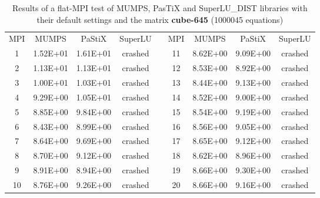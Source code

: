 \begin{table}[ht]
\centering
\begin{tabular}{|c|c|c|c|l|c|c|c|c|}
\cline{1-4} \cline{6-9}
MPI & MUMPS    & PaStiX   & SuperLU &  & MPI & MUMPS    & PaStiX   & SuperLU \\ \cline{1-4} \cline{6-9} 
1   & 1.52E+01 & 1.61E+01 & crashed &  & 11  & 8.62E+00 & 9.09E+00 & crashed \\ \cline{1-4} \cline{6-9} 
2   & 1.13E+01 & 1.13E+01 & crashed &  & 12  & 8.53E+00 & 8.92E+00 & crashed \\ \cline{1-4} \cline{6-9} 
3   & 1.00E+01 & 1.03E+01 & crashed &  & 13  & 8.44E+00 & 9.13E+00 & crashed \\ \cline{1-4} \cline{6-9} 
4   & 9.29E+00 & 1.05E+01 & crashed &  & 14  & 8.52E+00 & 9.00E+00 & crashed \\ \cline{1-4} \cline{6-9} 
5   & 8.85E+00 & 9.84E+00 & crashed &  & 15  & 8.54E+00 & 9.19E+00 & crashed \\ \cline{1-4} \cline{6-9} 
6   & 8.43E+00 & 8.99E+00 & crashed &  & 16  & 8.56E+00 & 9.05E+00 & crashed \\ \cline{1-4} \cline{6-9} 
7   & 8.64E+00 & 9.69E+00 & crashed &  & 17  & 8.65E+00 & 9.12E+00 & crashed \\ \cline{1-4} \cline{6-9} 
8   & 8.70E+00 & 9.12E+00 & crashed &  & 18  & 8.62E+00 & 8.96E+00 & crashed \\ \cline{1-4} \cline{6-9} 
9   & 8.91E+00 & 8.94E+00 & crashed &  & 19  & 8.66E+00 & 9.30E+00 & crashed \\ \cline{1-4} \cline{6-9} 
10  & 8.76E+00 & 9.26E+00 & crashed &  & 20  & 8.66E+00 & 9.16E+00 & crashed \\ \cline{1-4} \cline{6-9} 
\end{tabular}
\caption{Results of a flat-MPI test of MUMPS, PasTiX and SuperLU\_DIST libraries with their default settings and the matrix \textbf{cube-645} (1000045 equations)}
\label{table:app-lc-cube-645-result}
\end{table}

\newpage